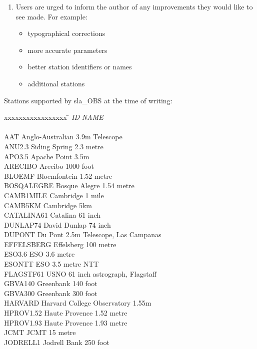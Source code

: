 {\begin{enumerate}
  \item Users are urged to inform the author of any improvements
        they would like to see made.  For example:
        \begin{itemize}
         \item typographical corrections
         \item more accurate parameters
         \item better station identifiers or names
         \item additional stations
        \end{itemize}
 \end{enumerate}
Stations supported by sla\_OBS at the time of writing:
\begin{tabbing}
xxxxxxxxxxxxxxxxx \= \kill
{\it ID} \> {\it NAME} \\ \\
AAT        \> Anglo-Australian 3.9m Telescope \\
ANU2.3     \> Siding Spring 2.3 metre \\
APO3.5     \> Apache Point 3.5m \\
ARECIBO    \> Arecibo 1000 foot \\
BLOEMF     \> Bloemfontein 1.52 metre \\
BOSQALEGRE \> Bosque Alegre 1.54 metre \\
CAMB1MILE  \> Cambridge 1 mile \\
CAMB5KM    \> Cambridge 5km \\
CATALINA61 \> Catalina 61 inch \\
DUNLAP74   \> David Dunlap 74 inch \\
DUPONT     \> Du Pont 2.5m Telescope, Las Campanas \\
EFFELSBERG \> Effelsberg 100 metre \\
ESO3.6     \> ESO 3.6 metre \\
ESONTT     \> ESO 3.5 metre NTT \\
FLAGSTF61  \> USNO 61 inch astrograph, Flagstaff \\
GBVA140    \> Greenbank 140 foot \\
GBVA300    \> Greenbank 300 foot \\
HARVARD    \> Harvard College Observatory 1.55m \\
HPROV1.52  \> Haute Provence 1.52 metre \\
HPROV1.93  \> Haute Provence 1.93 metre \\
JCMT       \> JCMT 15 metre \\
JODRELL1   \> Jodrell Bank 250 foot \\

\end{tabbing}}
